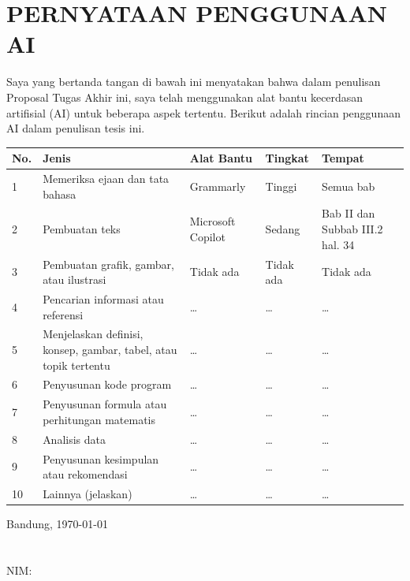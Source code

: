 \chapter*{PERNYATAAN PENGGUNAAN AI}
Saya yang bertanda tangan di bawah ini menyatakan bahwa dalam penulisan Proposal Tugas Akhir ini, saya telah menggunakan alat bantu kecerdasan artifisial (AI) untuk beberapa aspek tertentu. Berikut adalah rincian penggunaan AI dalam penulisan tesis ini.
\begin{table}[h]
\begin{tabular}{|p{0.5cm}| p{4cm} | p{2.5cm} | p{2.5cm} | p{3cm} @{}| }
\hline
\textbf{No.} & \textbf{Jenis} & \textbf{Alat Bantu} & \textbf{Tingkat} & \textbf{Tempat}\\
\hline
1 & Memeriksa ejaan dan tata bahasa & Grammarly & Tinggi & Semua bab \\
\hline
2 & Pembuatan teks & Microsoft Copilot & Sedang & Bab II dan Subbab III.2 hal. 34 \\
\hline
3 & Pembuatan grafik, gambar, atau ilustrasi & Tidak ada & Tidak ada & Tidak ada \\
\hline
4 & Pencarian informasi atau referensi & \ldots & \ldots & \ldots \\
\hline
5 & Menjelaskan definisi, konsep, gambar, tabel, atau topik tertentu  & \ldots & \ldots & \ldots \\
\hline
6 & Penyusunan kode program & \ldots & \ldots & \ldots \\
\hline
7 & Penyusunan formula atau perhitungan matematis & \ldots & \ldots & \ldots \\
\hline
8 &  Analisis data  & \ldots & \ldots & \ldots \\
\hline
9 & Penyusunan kesimpulan atau rekomendasi & \ldots & \ldots & \ldots \\
\hline
10 & Lainnya (jelaskan) & \ldots & \ldots & \ldots \\
\hline
\end{tabular}
\end{table}


Bandung, \today\\
\\[2cm]

\underline{\namapenulis} \\
NIM: \nimpenulis